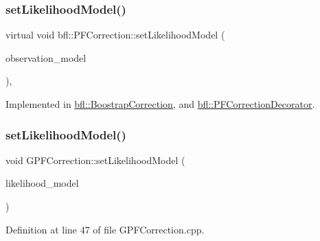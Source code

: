 \subsubsection{\texorpdfstring{set\+Likelihood\+Model()}{setLikelihoodModel()}\hspace{0.1cm}{\footnotesize\ttfamily [1/2]}}
{\footnotesize\ttfamily virtual void bfl\+::\+P\+F\+Correction\+::set\+Likelihood\+Model (\begin{DoxyParamCaption}\item[{std\+::unique\+\_\+ptr$<$ \mbox{\hyperlink{classbfl_1_1LikelihoodModel}{Likelihood\+Model}} $>$}]{observation\+\_\+model }\end{DoxyParamCaption})\hspace{0.3cm}{\ttfamily [pure virtual]}, {\ttfamily [inherited]}}



Implemented in \mbox{\hyperlink{classbfl_1_1BoostrapCorrection_a75d770c17ac4142833c926e9e6dc32db}{bfl\+::\+Boostrap\+Correction}}, and \mbox{\hyperlink{classbfl_1_1PFCorrectionDecorator_ab1065f8e47e4e51bc846b2d693b4bb88}{bfl\+::\+P\+F\+Correction\+Decorator}}.

\mbox{\label{classbfl_1_1GPFCorrection_a93104fdc7a1bccc4c7350fbd7bd46997}} 
\subsubsection{\texorpdfstring{set\+Likelihood\+Model()}{setLikelihoodModel()}\hspace{0.1cm}{\footnotesize\ttfamily [2/2]}}
{\footnotesize\ttfamily void G\+P\+F\+Correction\+::set\+Likelihood\+Model (\begin{DoxyParamCaption}\item[{std\+::unique\+\_\+ptr$<$ \mbox{\hyperlink{classbfl_1_1LikelihoodModel}{bfl\+::\+Likelihood\+Model}} $>$}]{likelihood\+\_\+model }\end{DoxyParamCaption})\hspace{0.3cm}{\ttfamily [override]}}



Definition at line 47 of file G\+P\+F\+Correction.\+cpp.

\mbox{\label{classbfl_1_1PFCorrection_a9844514568f65a0e5fa2cffadea460c6}} 
